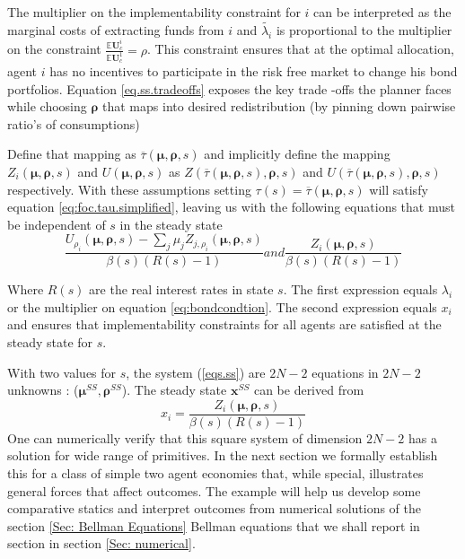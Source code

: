 \documentclass[thmsb,11pt]{article}
\newcommand{\ov}{\overline}
\begin{document}
The multiplier on the implementability constraint for $i$ can be interpreted as the marginal costs of extracting funds from $i$  and $\tilde{\lambda_i}$ is proportional to the multiplier on the constraint $\frac{\mathbb{E}\bm{U}^i_c}{\mathbb{E}\bm{U}^1_c}=\rho$. This constraint ensures that at the optimal allocation, agent $i$ has no  incentives to participate in the risk free market to change his bond portfolios. Equation \eqref{eq.ss.tradeoffs} exposes the key trade -offs the planner faces while choosing $\bm \rho$ that maps into desired redistribution (by pinning down pairwise ratio's of consumptions)

 Define that mapping as $\ov \tau(\bm \mu,\bm \rho,s)$ and implicitly define the mapping $Z_i(\bm \mu,\bm \rho,s)$ and $U(\bm \mu,\bm \rho,s)$ as $Z(\ov\tau(\bm \mu,\bm \rho,s),\bm \rho,s)$ and $U(\ov\tau(\bm \mu,\bm \rho,s),\bm \rho,s)$ respectively.  With these assumptions setting $\tau(s) = \ov\tau(\bm \mu,\bm \rho,s)$ will satisfy equation \eqref{eq:foc.tau.simplified}, leaving us with the following equations that must be independent of $s$ in the steady state
 \begin{subequations}
 \label{eqs.ss}
\begin{equation}
	\frac{U_{\rho_i}(\bm \mu,\bm \rho,s)-\sum_j\mu_j Z_{j,\rho_i}(\bm \mu,\bm \rho,s)}{\beta(s)(R(s)-1)}
\end{equation}and
\begin{equation}
	\frac{Z_i(\bm \mu,\bm \rho,s)}{\beta(s)(R(s)-1)}
\end{equation}
\end{subequations}

Where $R(s)$ are the real interest rates in state $s$. The first expression equals  $\lambda_i$ or the multiplier on equation \eqref{eq:bondcondtion}. The second expression equals $x_i$ and ensures that implementability constraints for all agents are satisfied at the steady state for $s$.


With two values for $s$, the system (\ref{eqs.ss}) are $2N-2$ equations in $2N-2$ unknowns : ($\bm \mu^{SS}, \bm \rho^{SS}$). The steady state $\bm x^{SS}$ can be derived from 
\begin{equation}
	x_i=\frac{Z_i(\bm \mu,\bm \rho,s)}{\beta(s)(R(s)-1)}
\end{equation}
One can numerically verify that this square system of dimension $2N-2$ has a solution for wide range of primitives. In the next section we formally establish this for a class of simple two agent economies that, while special, illustrates general forces that affect outcomes. The example will help us  develop some comparative statics and interpret  outcomes from numerical solutions of the section \ref{Sec: Bellman Equations} Bellman equations that we shall report in section in section \ref{Sec: numerical}.
\end{document}
